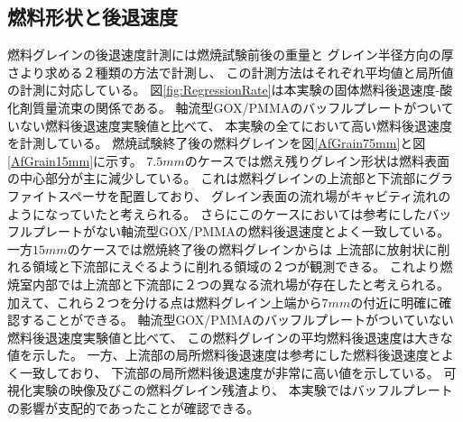 \subsection{燃料形状と後退速度}
燃料グレインの後退速度計測には燃焼試験前後の重量と
グレイン半径方向の厚さより求める２種類の方法で計測し、
この計測方法はそれぞれ平均値と局所値の計測に対応している。
図\ref{fig:RegressionRate}は本実験の固体燃料後退速度-酸化剤質量流束の関係である。
軸流型GOX/PMMAのバッフルプレートがついていない燃料後退速度実験値と比べて、
本実験の全てにおいて高い燃料後退速度を計測している。
燃焼試験終了後の燃料グレインを図\ref{AfGrain75mm}と図\ref{AfGrain15mm}に示す。
$7.5mm$のケースでは燃え残りグレイン形状は燃料表面の中心部分が主に減少している。
これは燃料グレインの上流部と下流部にグラファイトスペーサを配置しており、
グレイン表面の流れ場がキャビティ流れのようになっていたと考えられる。
さらにこのケースにおいては参考にしたバッフルプレートがない軸流型GOX/PMMAの燃料後退速度とよく一致している。
一方$15mm$のケースでは燃焼終了後の燃料グレインからは
上流部に放射状に削れる領域と下流部にえぐるように削れる領域の２つが観測できる。
これより燃焼室内部では上流部と下流部に２つの異なる流れ場が存在したと考えられる。
加えて、これら２つを分ける点は燃料グレイン上端から$7mm$の付近に明確に確認することができる。
軸流型GOX/PMMAのバッフルプレートがついていない燃料後退速度実験値と比べて、
この燃料グレインの平均燃料後退速度は大きな値を示した。
一方、上流部の局所燃料後退速度は参考にした燃料後退速度とよく一致しており、
下流部の局所燃料後退速度が非常に高い値を示している。
可視化実験の映像及びこの燃料グレイン残渣より、
本実験ではバッフルプレートの影響が支配的であったことが確認できる。
